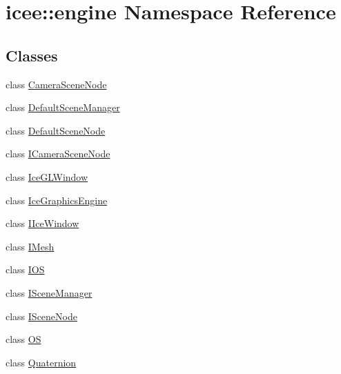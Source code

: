 \hypertarget{namespaceicee_1_1engine}{
\section{icee::engine Namespace Reference}
\label{namespaceicee_1_1engine}
}
\subsection*{Classes}
\begin{DoxyCompactItemize}
\item 
class \hyperlink{classicee_1_1engine_1_1CameraSceneNode}{CameraSceneNode}
\item 
class \hyperlink{classicee_1_1engine_1_1DefaultSceneManager}{DefaultSceneManager}
\item 
class \hyperlink{classicee_1_1engine_1_1DefaultSceneNode}{DefaultSceneNode}
\item 
class \hyperlink{classicee_1_1engine_1_1ICameraSceneNode}{ICameraSceneNode}
\item 
class \hyperlink{classicee_1_1engine_1_1IceGLWindow}{IceGLWindow}
\item 
class \hyperlink{classicee_1_1engine_1_1IceGraphicsEngine}{IceGraphicsEngine}
\item 
class \hyperlink{classicee_1_1engine_1_1IIceWindow}{IIceWindow}
\item 
class \hyperlink{classicee_1_1engine_1_1IMesh}{IMesh}
\item 
class \hyperlink{classicee_1_1engine_1_1IOS}{IOS}
\item 
class \hyperlink{classicee_1_1engine_1_1ISceneManager}{ISceneManager}
\item 
class \hyperlink{classicee_1_1engine_1_1ISceneNode}{ISceneNode}
\item 
class \hyperlink{classicee_1_1engine_1_1OS}{OS}
\item 
class \hyperlink{classicee_1_1engine_1_1Quaternion}{Quaternion}
\end{DoxyCompactItemize}
